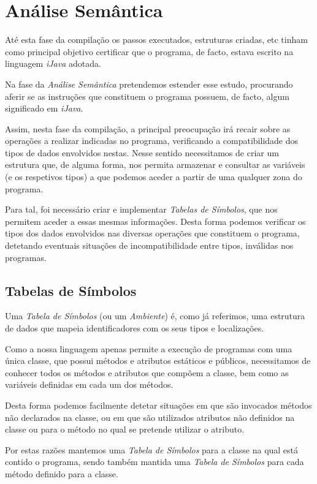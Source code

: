 \documentclass[11pt,a4paper]{article}
\begin{document}
\pagebreak

\section{Análise Semântica}

	Até esta fase da compilação os passos executados, estruturas criadas, etc tinham como principal objetivo certificar que o programa, de facto, estava escrito na linguagem \emph{iJava} adotada.
	
	Na fase da \emph{Análise Semântica} pretendemos estender esse estudo, procurando aferir se as instruções que constituem o programa possuem, de facto, algum significado em \emph{iJava}.
	
	Assim, nesta fase da compilação, a principal preocupação irá recair sobre as operações a realizar indicadas no programa, verificando a compatibilidade dos tipos de dados envolvidos nestas. Nesse sentido necessitamos de criar um estrutura que, de alguma forma, nos permita armazenar e consultar as variáveis (e os respetivos tipos) a que podemos aceder a partir de uma qualquer zona do programa.
	
	Para tal, foi necessário criar e implementar \emph{Tabelas de Símbolos}, que nos permitem aceder a essas mesmas informações. Desta forma podemos verificar os tipos dos dados envolvidos nas diversas operações que constituem o programa, detetando eventuais situações de incompatibilidade entre tipos, inválidas nos programas.

	\subsection{Tabelas de Símbolos}
	
	Uma \emph{Tabela de Símbolos} (ou um \emph{Ambiente}) é, como já referimos, uma estrutura de dados que mapeia identificadores com os seus tipos e localizações.
	
	Como a nossa linguagem apenas permite a execução de programas com uma única classe, que possui métodos e atributos estáticos e públicos, necessitamos de conhecer todos os métodos e atributos que compõem a classe, bem como as variáveis definidas em cada um dos métodos.
	
	Desta forma podemos facilmente detetar situações em que são invocados métodos não declarados na classe, ou em que são utilizados atributos não definidos na classe ou para o método no qual se pretende utilizar o atributo. 

	Por estas razões mantemos uma \emph{Tabela de Símbolos} para a classe na qual está contido o programa, sendo também mantida uma \emph{Tabela de Símbolos} para cada método definido para a classe.
	
\end{document}
